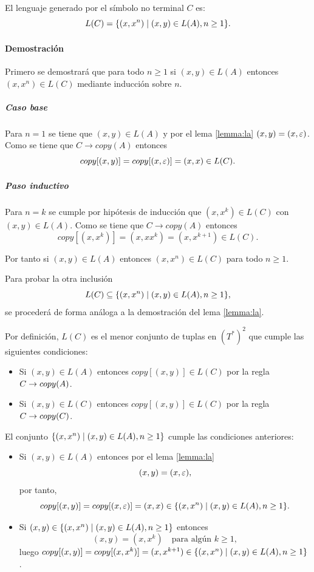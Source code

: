 \begin{lemma}
    \label{lem:lc}
    El lenguaje generado por el símbolo no terminal $C$ es:
    $$
        L(C) = \{(x, x^n) \;|\; (x, y) \in L(A), n \geq 1\}.
    $$
\end{lemma}

\paragraph{Demostración}

Primero se demostrará que para todo $n \geq 1$ si $(x, y) \in L(A)$ entonces $(x, x^n) \in L(C)$ mediante inducción sobre $n$.

\subparagraph{Caso base} Para $n = 1$ se tiene que $(x, y) \in L(A)$ y por el lema \ref{lemma:la} $(x, y) = (x, \varepsilon)$. Como se tiene que $C \to copy(A)$ entonces
$$
    copy[(x, y)] = copy[(x, \varepsilon)] = (x, x) \in L(C).
$$

\subparagraph{Paso inductivo} Para $n = k$  se cumple por hipótesis de inducción que $(x, x^k) \in L(C)$ con $(x, y) \in L(A)$. Como se tiene que $C \to copy(A)$ entonces
$$
    copy[(x, x^k)] = (x, xx^k) = (x, x^{k+1}) \in L(C).
$$

Por tanto si $(x, y) \in L(A)$ entonces $(x, x^n) \in L(C)$ para todo $n \geq 1$.

Para probar la otra inclusión
$$
    L(C) \subseteq \{(x, x^n) \;|\; (x, y) \in L(A), n \geq 1\},
$$
se procederá de forma análoga a la demostración del lema \ref{lemma:la}.

Por definición, $L(C)$ es el menor conjunto de tuplas en $(T^*)^2$ que cumple las siguientes condiciones:
\begin{itemize}
    \item Si $(x, y) \in L(A)$ entonces $copy[(x, y)] \in L(C)$ por la regla $C \rightarrow copy(A)$.
    \item Si $(x, y) \in L(C)$ entonces $copy[(x, y)] \in L(C)$ por la regla $C \rightarrow copy(C)$.
\end{itemize}

El conjunto $\{(x, x^n) \;|\; (x, y) \in L(A), n \geq 1\}$ cumple las condiciones anteriores:
\begin{itemize}
    \item Si $(x, y) \in L(A)$ entonces por el lema \ref{lemma:la}
          $$
              (x, y) = (x, \varepsilon),
          $$
          por tanto,
          $$copy[(x, y)] = copy[(x, \varepsilon)] = (x, x) \in \{(x, x^n) \;|\; (x, y) \in L(A), n \geq 1\}.$$
    \item Si $(x, y) \in \{(x, x^n) \;|\; (x, y) \in L(A), n \geq 1\}$ entonces $$
              (x, y) = (x, x^k) \quad \text{para algún } k \geq 1,
          $$
          luego $copy[(x, y)] = copy[(x, x^{k})] = (x, x^{k+1}) \in \{(x, x^n) \;|\; (x, y) \in L(A), n \geq 1\}$.
\end{itemize}

